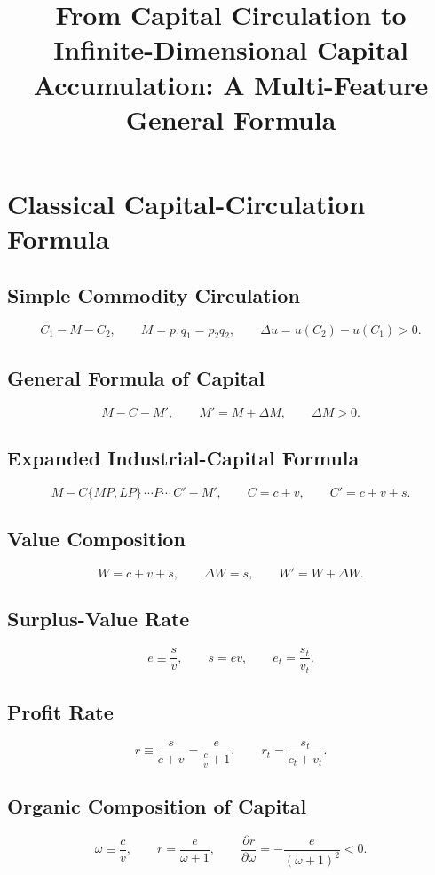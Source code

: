 \documentclass[11pt]{article}
\title{From Capital Circulation to Infinite-Dimensional Capital Accumulation: A Multi-Feature General Formula}
\author{}
\date{}
\begin{document}
\maketitle

\section{Classical Capital-Circulation Formula}

\subsection{Simple Commodity Circulation}
\[
C_1 - M - C_2,
\qquad M=p_1 q_1=p_2 q_2,
\qquad \Delta u=u(C_2)-u(C_1)>0.
\]

\subsection{General Formula of Capital}
\[
M-C-M',
\qquad M'=M+\Delta M,
\qquad \Delta M>0.
\]

\subsection{Expanded Industrial-Capital Formula}
\[
M-C\{MP,LP\}\,\cdots P\cdots\,C'-M',
\qquad C=c+v,
\qquad C'=c+v+s.
\]

\subsection{Value Composition}
\[
W=c+v+s,
\qquad \Delta W=s,
\qquad W'=W+\Delta W.
\]

\subsection{Surplus-Value Rate}
\[
e\equiv \frac{s}{v},
\qquad s=e v,
\qquad e_t=\frac{s_t}{v_t}.
\]

\subsection{Profit Rate}
\[
r\equiv \frac{s}{c+v}=\frac{e}{\frac{c}{v}+1},
\qquad r_t=\frac{s_t}{c_t+v_t}.
\]

\subsection{Organic Composition of Capital}
\[
\omega\equiv\frac{c}{v},
\qquad r=\frac{e}{\omega+1},
\qquad \frac{\partial r}{\partial \omega}=-\frac{e}{(\omega+1)^2}<0.
\]
\end{document}

